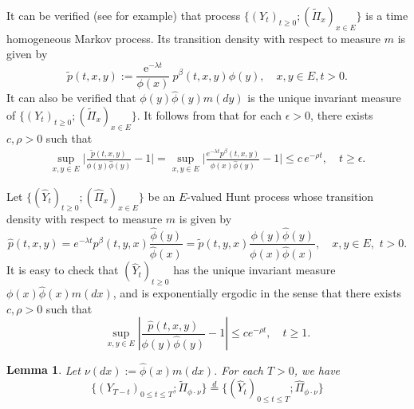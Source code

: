 \documentclass[12pt,a4paper]{amsart}
\numberwithin{equation}{section}
\theoremstyle{plain}
\newtheorem{lem}[thm]{Lemma}
\theoremstyle{definition}
\begin{document}
It can be verified (see \cite{KimSong2008Intrinsic} for example) that process $\{(Y_t)_{t\geq 0}; (\widetilde\Pi_x)_{x\in E}\}$ is a time homogeneous Markov process.
Its transition density with respect to measure $m$ is given by
\begin{equation}
  \label{eq:tilde_p}
  \widetilde p(t, x, y)
  :=\frac{\mbox{e}^{-\lambda t}}{\phi(x)}\ p^\beta(t, x, y)\phi(y),
  \quad x,y \in E,t>0.
\end{equation}
It can also be verified that $\phi(y)\widehat{\phi}(y)m(dy)$ is the unique invariant measure of $\{(Y_t)_{t\geq 0}; (\widetilde\Pi_x)_{x\in E}\}$.
It follows from \cite[Theorem 2.7]{KimSong2008Intrinsic} that for each $\epsilon > 0$, there exists $c, \rho > 0$ such that 
\begin{align}
\label{eq:IU}
	\sup_{x,y\in E}\Big|\frac{\widetilde p(t,x,y)}{\phi(y) \widehat\phi(y)}- 1\Big|
	=\sup_{x,y\in E}\Big|\frac{e^{-\lambda t}p^\beta(t,x,y)}{\phi(x) \widehat\phi(y)}- 1\Big|
	\leq c\,e^{-\rho t},
	\quad t\geq \epsilon.
\end{align}
\par
Let $\{(\widehat{Y}_t)_{t\geq 0}; (\widehat{\Pi}_x)_{x\in E}\}$ be an $E$-valued Hunt process whose transition density with respect to measure $m$ is given by
\[
  \widehat{p}(t,x,y)
  =e^{-\lambda t}p^\beta(t,y,x)\frac{{\widehat\phi}(y)}{{\widehat\phi}(x)}
  =\widetilde p(t,y,x)\frac{\phi(y){\widehat\phi}(y)}{\phi(x){\widehat\phi}(x)},
  \quad x,y \in E,\,\, t> 0.
\]
It is easy to check that $(\widehat Y_t)_{t\geq 0}$ has the unique invariant measure $\phi(x)\widehat\phi(x)m(dx)$, and is exponentially ergodic in the sense that there exists $c, \rho > 0$ such that
\begin{equation}\label{eq:IU'}
	\sup_{x,y\in E}\left|\frac{\widehat{p}(t, x,y)}{\phi(y) \widehat\phi(y)}- 1\right|\le ce^{-\rho t}, \quad t\geq 1.
\end{equation}
\begin{lem}
  \label{lem:reverse of the spine}
	Let $\nu(dx):=\widehat\phi(x)m(dx)$.
	For each $T > 0$, we have
  \[
    \{(Y_{T-t})_{0\leq t\leq T}; \widetilde \Pi_{\phi \cdot \nu}\}
    \overset{d}{=} \{(\widehat Y_{t})_{0\leq t\leq T}; \widehat \Pi_{\phi \cdot \nu}\}
  \]
\end{lem}
\end{document}
